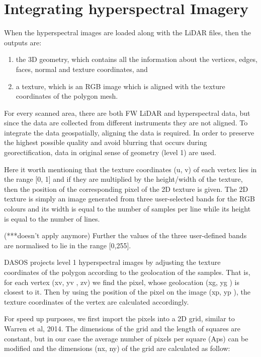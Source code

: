 \documentclass{subfiles}
\begin{document}
	\section{Integrating hyperspectral Imagery}
	\par When the hyperspectral images are loaded along with the LiDAR files, then the outputs are: 	
	\begin{enumerate}
		\item the 3D geometry, which contains all the information about the vertices, edges, faces, normal and texture coordinates, and
		\item  a texture, which is an RGB image which is aligned with the texture coordinates of the polygon mesh.
	\end{enumerate}

	\par For every scanned area, there are both FW LiDAR and hyperspectral data, but since the data are collected from different instruments they are not aligned. To integrate the data geospatially, aligning the data is required. In order to preserve the highest possible quality and avoid blurring that occurs 	during georectification, data in original sense of geometry (level 1) are used.
	
	\par Here it worth mentioning that the texture coordinates (u, v) of each vertex lies in the range [0, 1] and if they are multiplied by the height/width of the texture, then the position of the corresponding pixel of the 2D texture is given. The 2D texture is simply an image generated from three user-selected bands for the RGB colours and its width is equal to the number of samples per line while its height is equal to the number of lines.
	
	\par (***doesn't apply anymore) Further the values of the three user-defined bands are normalised to lie in the range [0,255].
	
	\par DASOS projects level 1 hyperspectral images by adjusting the texture coordinates of the polygon according to the geolocation of the samples. That is, for each vertex (xv, yv , zv) we find the pixel, whose geolocation (xg, yg ) is closest to it. Then by using the position of the pixel on the image (xp, yp ), the texture coordinates of the vertex are calculated accordingly.
	
	\par For speed up purposes, we first import the pixels into a 2D grid, similar to Warren et al, 2014. The dimensions of the grid and the length of squares are constant, but in our case the average number of pixels per square (Aps) can be modified and the dimensions (nx, ny) of the grid are calculated as follow:
	
\end{document}
